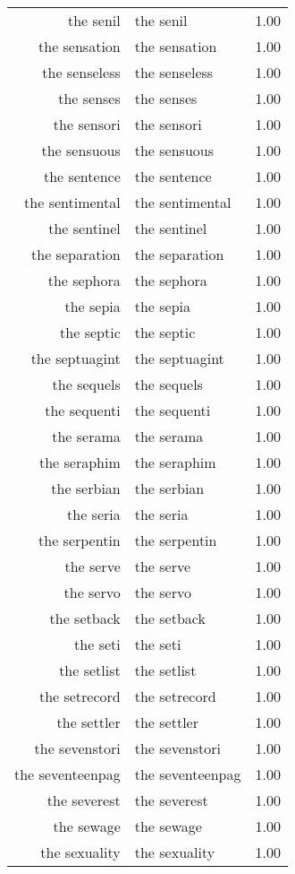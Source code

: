 \begin{table}[ht]
\begin{tabular}{rlr}
  the senil & the senil & 1.00 \\ 
  the sensation & the sensation & 1.00 \\ 
  the senseless & the senseless & 1.00 \\ 
  the senses & the senses & 1.00 \\ 
  the sensori & the sensori & 1.00 \\ 
  the sensuous & the sensuous & 1.00 \\ 
  the sentence & the sentence & 1.00 \\ 
  the sentimental & the sentimental & 1.00 \\ 
  the sentinel & the sentinel & 1.00 \\ 
  the separation & the separation & 1.00 \\ 
  the sephora & the sephora & 1.00 \\ 
  the sepia & the sepia & 1.00 \\ 
  the septic & the septic & 1.00 \\ 
  the septuagint & the septuagint & 1.00 \\ 
  the sequels & the sequels & 1.00 \\ 
  the sequenti & the sequenti & 1.00 \\ 
  the serama & the serama & 1.00 \\ 
  the seraphim & the seraphim & 1.00 \\ 
  the serbian & the serbian & 1.00 \\ 
  the seria & the seria & 1.00 \\ 
  the serpentin & the serpentin & 1.00 \\ 
  the serve & the serve & 1.00 \\ 
  the servo & the servo & 1.00 \\ 
  the setback & the setback & 1.00 \\ 
  the seti & the seti & 1.00 \\ 
  the setlist & the setlist & 1.00 \\ 
  the setrecord & the setrecord & 1.00 \\ 
  the settler & the settler & 1.00 \\ 
  the sevenstori & the sevenstori & 1.00 \\ 
  the seventeenpag & the seventeenpag & 1.00 \\ 
  the severest & the severest & 1.00 \\ 
  the sewage & the sewage & 1.00 \\ 
  the sexuality & the sexuality & 1.00 \\ 

\end{tabular}
\end{table}
